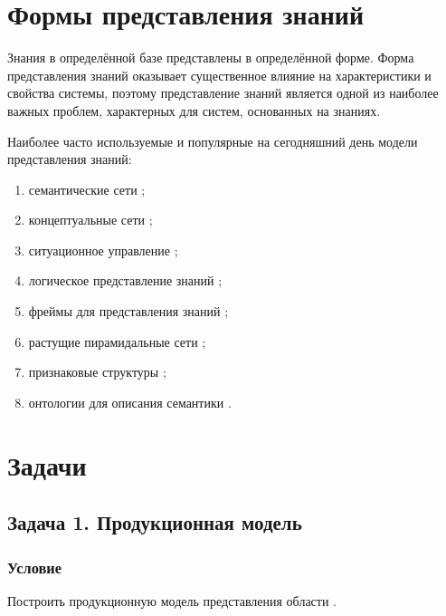 \documentclass[14pt, a4paper, titlepage]{extarticle}
\begin{document}
\section{Формы представления знаний}

Знания в определённой базе представлены в определённой форме. Форма представления знаний оказывает существенное влияние на характеристики и свойства системы, поэтому представление знаний является одной из наиболее важных проблем, характерных для систем, основанных на знаниях.\cite{белоус2010современные}

Наиболее часто используемые и популярные на сегодняшний день модели представления знаний\cite{карелин2014модели}:
\begin{enumerate}
	\item семантические сети \cite{нильсон1985принципы, попова2019основные, nguyen2020lemma, загорулько2011подход};
	\item концептуальные сети \cite{шенк1980обработка};
	\item ситуационное управление \cite{поспелов2020ситуационное};
	\item логическое представление знаний \cite{братко2004алгоритмы};
	\item фреймы для представления знаний \cite{минский1979фреймы};
	\item растущие пирамидальные сети \cite{гладун2004растущие};
	\item признаковые структуры \cite{knight1989unification};
	\item онтологии для описания семантики \cite{abdul2007common}.
\end{enumerate}



\printbibliography

\clearpage

\section{Задачи}

\subsection{Задача 1. Продукционная модель}

\subsubsection*{Условие}

Построить продукционную модель представления области .
\end{document}
